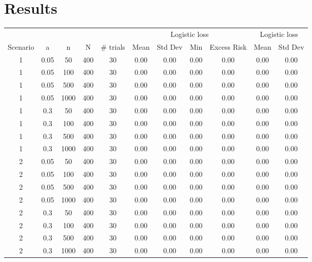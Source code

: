 \documentclass[11pt]{article}
\begin{document}
\section{Results}
\begin{tabular}{c|c|c|c|c|c|c|c|c|c|c} 
\multicolumn{5}{c}{}             &  \multicolumn{4}{c}{Logistic loss}        & \multicolumn{2}{c}{Logistic loss} \\
{Scenario} & {a}   & {n}  & {N}  & {\# trials} & {Mean} & {Std Dev} & {Min} & {Excess Risk} & {Mean} & {Std Dev} \\ \hline
    1      & 0.05  & 50   & 400  & 30          & 0.00   & 0.00      & 0.00  & 0.00          & 0.00   & 0.00      \\
    1      & 0.05  & 100  & 400  & 30	       & 0.00   & 0.00      & 0.00  & 0.00          & 0.00   & 0.00      \\
    1      & 0.05  & 500  & 400  & 30 	       & 0.00   & 0.00      & 0.00  & 0.00          & 0.00   & 0.00      \\
    1      & 0.05  & 1000 & 400  & 30 	       & 0.00   & 0.00      & 0.00  & 0.00          & 0.00   & 0.00      \\ \hline
    1      & 0.3   & 50   & 400  & 30 	       & 0.00   & 0.00      & 0.00  & 0.00          & 0.00   & 0.00      \\
    1      & 0.3   & 100  & 400  & 30 	       & 0.00   & 0.00      & 0.00  & 0.00          & 0.00   & 0.00      \\
    1      & 0.3   & 500  & 400  & 30 	       & 0.00   & 0.00      & 0.00  & 0.00          & 0.00   & 0.00      \\
    1      & 0.3   & 1000 & 400  & 30 	       & 0.00   & 0.00      & 0.00  & 0.00          & 0.00   & 0.00      \\ \hline
    2      & 0.05  & 50   & 400  & 30          & 0.00   & 0.00      & 0.00  & 0.00          & 0.00   & 0.00      \\
    2      & 0.05  & 100  & 400  & 30	       & 0.00   & 0.00      & 0.00  & 0.00          & 0.00   & 0.00      \\
    2      & 0.05  & 500  & 400  & 30 	       & 0.00   & 0.00      & 0.00  & 0.00          & 0.00   & 0.00      \\
    2      & 0.05  & 1000 & 400  & 30 	       & 0.00   & 0.00      & 0.00  & 0.00          & 0.00   & 0.00      \\ \hline
    2      & 0.3   & 50   & 400  & 30 	       & 0.00   & 0.00      & 0.00  & 0.00          & 0.00   & 0.00      \\
    2      & 0.3   & 100  & 400  & 30 	       & 0.00   & 0.00      & 0.00  & 0.00          & 0.00   & 0.00      \\
    2      & 0.3   & 500  & 400  & 30 	       & 0.00   & 0.00      & 0.00  & 0.00          & 0.00   & 0.00      \\
    2      & 0.3   & 1000 & 400  & 30 	       & 0.00   & 0.00      & 0.00  & 0.00          & 0.00   & 0.00      \\ 
\end{tabular}
\end{document}
